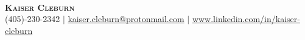 \documentclass[letterpaper,12pt]{article} %
\begin{document}
\begin{comment}
In Europe it is common to include a picture of ones self in the CV. Select
which heading appropriate for the document you are creating.
\end{comment}

\begin{minipage}[c]{0.05\textwidth}
\-\
\end{minipage}

\begin{center}
    \textbf{\Huge \scshape Kaiser Cleburn} \\ \vspace{1pt} %
    \small (405)-230-2342 $|$ 
    \href{mailto:kaiser.cleburn@protonmail.com}{kaiser.cleburn@protonmail.com} $|$
	\url{www.linkedin.com/in/kaiser-cleburn}
\end{center}
\end{document}
